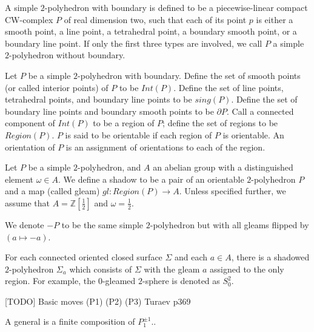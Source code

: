 \begin{definition}\label{def/simple-2-polyhedron}
  A simple $2$-polyhedron with boundary is defined to be a
  piecewise-linear compact CW-complex $P$ of real dimension two,
  such that each of its point $p$ is either a smooth point, a
  line point, a tetrahedral point, a boundary smooth point, or a
  boundary line point. If only the first three types are
  involved, we call $P$ a simple $2$-polyhedron without boundary.
\end{definition}

\begin{definition}\label{def/components-of-a-simple-2-polyhedron}
  Let $P$ be a simple $2$-polyhedron with boundary. Define the
  set of smooth points (or called interior points) of $P$ to be
  $Int(P)$. Define the set of line points, tetrahedral points,
  and boundary line points to be $sing(P)$. Define the set of
  boundary line points and boundary smooth points to be
  $\partial P$. Call a connected component of $Int(P)$ to be a
  region of $P$; define the set of regions to be $Region(P)$. $P$
  is said to be orientable if each region of $P$ is orientable.
  An orientation of $P$ is an assignment of orientations to each
  of the region.
\end{definition}

\begin{definition}\label{def/shadowed-2-polyhedron}
  Let $P$ be a simple $2$-polyhedron, and $A$ an abelian group
  with a distinguished element $\omega \in A$. We define a shadow
  to be a pair of an orientable $2$-polyhedron $P$ and a map
  (called gleam) $gl: Region(P) \to A$. Unless specified further,
  we assume that $A = \mathbb{Z}[\frac{1}{2}]$ and
  $\omega = \frac{1}{2}$.

  \noindent We denote $-P$ to be the same simple $2$-polyhedron
  but with all gleams flipped by $(a \mapsto -a)$.
\end{definition}

For each connected oriented closed surface $\Sigma$ and each
$a \in A$, there is a shadowed $2$-polyhedron $\Sigma_{a}$ which
consists of $\Sigma$ with the gleam $a$ assigned to the only
region. For example, the $0$-gleamed $2$-sphere is denoted as
$S^{2}_{0}$.

\begin{definition}\label{def/shadow-moves}
  [TODO]
Basic moves
  (P1)
  (P2)
  (P3)
  Turaev p369

  A general is a finite composition of $P_1^{\pm 1}$..
\end{definition}

